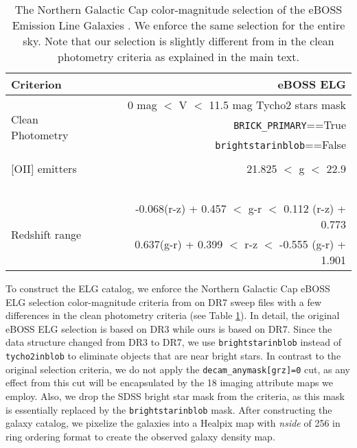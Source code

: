 \documentclass[fleqn, usenatbib]{mnras}
\begin{document}
\begin{table}
  \begin{center}
    \caption{The Northern Galactic Cap color-magnitude selection of the eBOSS Emission Line Galaxies \citep{Raichoor2017MNRAS.471.3955R}. We enforce the same selection for the entire sky. Note that our selection is slightly different from \citet{Raichoor2017MNRAS.471.3955R} in the clean photometry criteria as explained in the main text.}
    \label{tab:ts}
    \begin{tabular}{l|r}
    \hline
	\hline
      \textbf{Criterion} & \textbf{eBOSS ELG}\\
      \hline
      \multirow{4}{*}{\scriptsize{Clean Photometry}} & \scriptsize{0 mag $<$ V $<$ 11.5 mag Tycho2 stars mask}\\
& \scriptsize{\texttt{BRICK\_PRIMARY}==True}\\
& \scriptsize{\texttt{brightstarinblob}==False} \\~\\
      \scriptsize{[OII] emitters} &  \scriptsize{21.825 $<$ g $<$ 22.9} \\~\\
      \multirow{2}{*}{\scriptsize{Redshift range}} & \scriptsize{-0.068(r-z) + 0.457 $<$ g-r $<$ 0.112 (r-z) + 0.773}\\
 & \scriptsize{0.637(g-r) + 0.399 $<$ r-z $<$ -0.555 (g-r) + 1.901}\\
      \hline
      \hline
      \end{tabular}
  \end{center}
\end{table}


To construct the ELG catalog, we enforce the Northern Galactic Cap eBOSS ELG selection color-magnitude criteria from \citet{Raichoor2017MNRAS.471.3955R} on DR7 sweep files \citep{dey2018overview} with a few differences in the clean photometry criteria (see Table \ref{tab:ts}). In detail, the original eBOSS ELG selection is based on DR3 while ours is based on DR7. Since the data structure changed from DR3 to DR7, we use \texttt{brightstarinblob} instead of \texttt{tycho2inblob} to eliminate objects that are near bright stars. In contrast to the original selection criteria, we do not apply the \texttt{decam\_anymask[grz]=0} cut, as any effect from this cut will be encapsulated by the 18 imaging attribute maps we employ. Also, we drop the SDSS bright star mask from the criteria, as this mask is essentially replaced by the \texttt{brightstarinblob} mask. After constructing the galaxy catalog, we pixelize the galaxies into a Healpix map with \textit{nside} of 256 in ring ordering format to create the observed galaxy density map.\\
\end{document}
